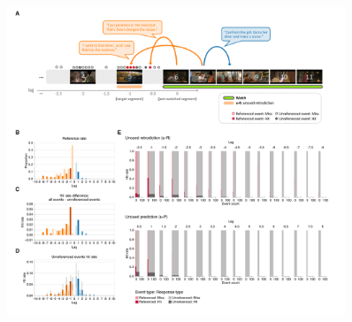\documentclass[10pt]{article}
\begin{document}
\begin{figure}[tp]
  \centering
  \includegraphics[width=0.9\textwidth]{results3}


\end{figure}
\end{document}
